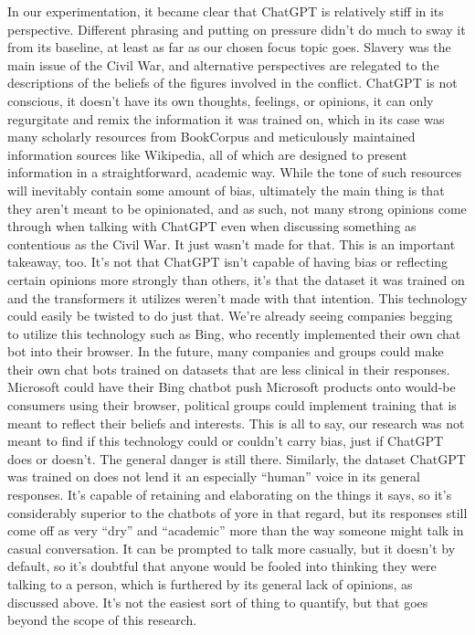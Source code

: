 \documentclass[letterpaper, 10pt, conference]{ieeeconf}
\begin{document}
    In our experimentation, it became clear that ChatGPT is relatively stiff in its perspective. Different phrasing and putting on pressure didn’t do much to sway it from its baseline, at least as far as our chosen focus topic goes. Slavery was the main issue of the Civil War, and alternative perspectives are relegated to the descriptions of the beliefs of the figures involved in the conflict. ChatGPT is not conscious, it doesn’t have its own thoughts, feelings, or opinions, it can only regurgitate and remix the information it was trained on, which in its case was many scholarly resources from BookCorpus and meticulously maintained information sources like Wikipedia, all of which are designed to present information in a straightforward, academic way. While the tone of such resources will inevitably contain some amount of bias, ultimately the main thing is that they aren’t meant to be opinionated, and as such, not many strong opinions come through when talking with ChatGPT even when discussing something as contentious as the Civil War. It just wasn’t made for that.
        This is an important takeaway, too. It’s not that ChatGPT isn’t capable of having bias or reflecting certain opinions more strongly than others, it’s that the dataset it was trained on and the transformers it utilizes weren’t made with that intention. This technology could easily be twisted to do just that. We’re already seeing companies begging to utilize this technology such as Bing, who recently implemented their own chat bot into their browser. In the future, many companies and groups could make their own chat bots trained on datasets that are less clinical in their responses. Microsoft could have their Bing chatbot push Microsoft products onto would-be consumers using their browser, political groups could implement training that is meant to reflect their beliefs and interests. This is all to say, our research was not meant to find if this technology could or couldn’t carry bias, just if ChatGPT does or doesn’t. The general danger is still there.
        Similarly, the dataset ChatGPT was trained on does not lend it an especially “human” voice in its general responses. It’s capable of retaining and elaborating on the things it says, so it’s considerably superior to the chatbots of yore in that regard, but its responses still come off as very “dry” and “academic” more than the way someone might talk in casual conversation. It can be prompted to talk more casually, but it doesn’t by default, so it’s doubtful that anyone would be fooled into thinking they were talking to a person, which is furthered by its general lack of opinions, as discussed above. It’s not the easiest sort of thing to quantify, but that goes beyond the scope of this research.
\end{document}
